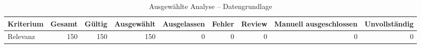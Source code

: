 \begin{table}[htbp]
\centering
\caption{Ausgewählte Analyse -- Datengrundlage}
\begin{tabular}{lrrrrrrrr}
\toprule
Kriterium & Gesamt & Gültig & Ausgewählt & Ausgelassen & Fehler & Review & Manuell ausgeschlossen & Unvollständig \\
\midrule
Relevanz & 150 & 150 & 150 & 0 & 0 & 0 & 0 & 0 \\
\bottomrule
\end{tabular}
\end{table}
